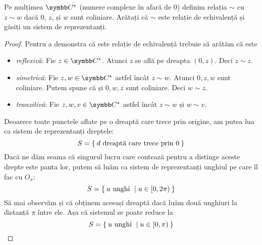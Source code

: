 \begin{exercise}
Pe mulțimea \(\complex^*\) (numere complexe în afară de \(0\)) definim relația \(\sim\) cu \(z \sim w\) dacă \(0\), \(z\), și \(w\) sunt coliniare. Arătați că \(\sim\) este relație de echivalență și găsiți un sistem de reprezentanți.
\end{exercise}
\begin{proof}
Pentru a demonstra că este relație de echivalență trebuie să arătăm că este
\begin{itemize}
    \item \emph{reflexivă}: Fie \(z \in \complex^*\). Atunci \(z\) se află pe dreapta \((0, z)\). Deci \(z \sim z\).
    \item \emph{simetrică}: Fie \(z, w \in \complex^*\) astfel încât \(z \sim w\). Atunci \(0, z, w\) sunt coliniare. Putem spune că și \(0, w, z\) sunt coliniare. Deci \(w \sim z\).
    \item \emph{tranzitivă}: Fie \(z, w, v \in \complex^*\) astfel încât \(z \sim w\) și \(w \sim v\).
\end{itemize}
Deoarece toate punctele aflate pe o dreaptă care trece prin origine, am putea lua ca sistem de reprezentanți dreptele:
\[
    S = \Set{ d \text{ dreaptă care trece prin } 0 }
\]
Dacă ne dăm seama că singurul lucru care contează pentru a distinge aceste drepte este panta lor, putem să luăm ca sistem de reprezentanți unghiul pe care îl fac cu \(O_x\):
\[
    S = \Set{ u \text{ unghi } | u \in [0, 2 \pi) }
\]
Să mai observăm și că obținem aceeași dreaptă dacă luăm două unghiuri la distanță \(\pi\) între ele. Așa că sistemul se poate reduce la
\[
    S = \Set{ u \text{ unghi } | u \in [0, \pi) }
\]
\end{proof}

